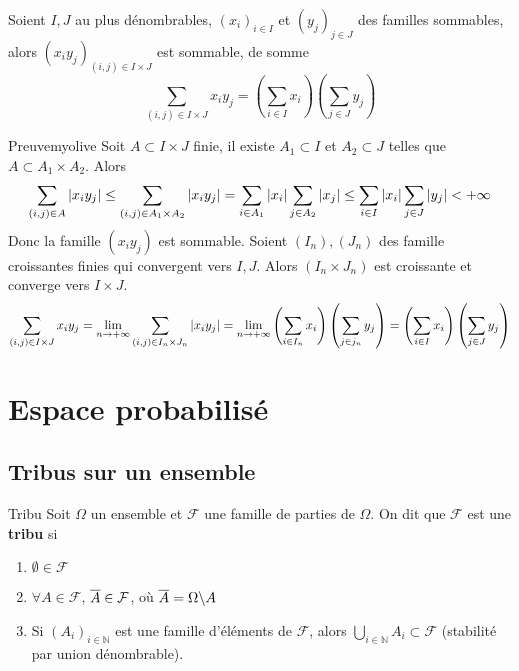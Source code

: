     \begin{prop}{}{}
        Soient $I,J$ au plus dénombrables, $(x_i)_{i \in I}$ et $(y_j)_{j \in J}$ des familles sommables, alors $(x_i y_j)_{(i,j) \in I \times J}$ est sommable, de somme 
        \[ \sum_{(i,j) \in I \times J} x_i y_j = \left(\sum_{i \in I} x_i\right)\left(\sum_{j \in J} y_j\right) \]      
    \end{prop}

    \begin{demo}{Preuve}{myolive}
        Soit $A \subset I \times J$ finie, il existe $A_1 \subset I$ et $A_2 \subset J$ telles que $A \subset A_1 \times A_2$. Alors 
        \[ \sum_{(i,j) \in A} \left\lvert x_i y_j\right\rvert \leq \sum_{(i,j) \in A_1 \times A_2} \left\lvert x_i y_j\right\rvert = \sum_{i \in A_1} \left\lvert x_i\right\rvert \sum_{j \in A_2} \left\lvert x_j\right\rvert \leq \sum_{i \in I} \left\lvert x_i\right\rvert \sum_{j \in J} \left\lvert y_j\right\rvert < +\infty \]  
        Donc la famille $(x_i y_j)$ est sommable. Soient $(I_n), (J_n)$ des famille croissantes finies qui convergent vers $I,J$. Alors $(I_n \times J_n)$ est croissante et converge vers $I \times J$. 
        \[ \sum_{(i,j) \in I \times J} x_i y_j = \lim_{n \to +\infty} \sum_{(i,j) \in I_n \times J_n} \left\lvert x_i y_j\right\rvert = \lim_{n \to +\infty} \left(\sum_{i \in I_n} x_i\right) \left(\sum_{j \in j_n} y_j \right) = \left(\sum_{i \in I} x_i\right) \left(\sum_{j \in J} y_j\right) \]
    \end{demo}

\section{Espace probabilisé}

    \subsection{Tribus sur un ensemble}

    \begin{defi}{Tribu}{}
        Soit $\Omega$ un ensemble et $\mathcal{F}$ une famille de parties de $\Omega$. On dit que $\mathcal{F}$ est une \textbf{tribu} si 
        \begin{enumerate}
            \item $\emptyset \in \mathcal{F}$
            \item $\forall A \in \mathcal{F}$, $\overline{A} \in \mathcal{F}$, où $\overline{A} = \Omega \backslash A$
            \item Si $(A_i)_{i \in \mathbb{N}}$ est une famille d’éléments de $\mathcal{F}$, alors $\bigcup_{i \in \mathbb{N}} A_i \subset \mathcal{F}$ (stabilité par union dénombrable).
        \end{enumerate}
    \end{defi}


